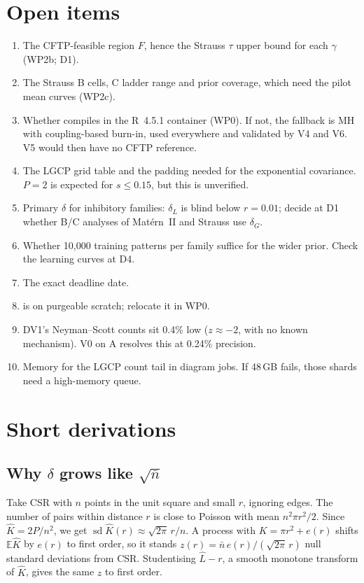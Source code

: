 \documentclass[10pt,a4paper]{article}
\newcommand{\code}[1]{\texttt{\detokenize{#1}}}
\newcommand{\nbar}{\bar n}
\newcommand{\E}{\mathbb{E}}
\begin{document}
\section{Open items}\label{sec:open}
\begin{enumerate}
  \item The CFTP-feasible region $F$, hence the Strauss $\tau$ upper bound for each $\gamma$ (WP2b; D1).
  \item The Strauss B cells, C ladder range and prior coverage, which need the pilot mean curves (WP2c).
  \item Whether \code{spatstat.random} compiles in the R~4.5.1 container (WP0). If not, the fallback is MH with coupling-based burn-in, used everywhere and validated by V4 and V6. V5 would then have no CFTP reference.
  \item The LGCP grid table and the padding needed for the exponential covariance. $P=2$ is expected for $s\le0.15$, but this is unverified.
  \item Primary $\delta$ for inhibitory families: $\delta_L$ is blind below $r=0.01$; decide at D1 whether B/C analyses of Mat\'ern~II and Strauss use $\delta_G$.
  \item Whether 10{,}000 training patterns per family suffice for the wider prior. Check the learning curves at D4.
  \item The exact deadline date.
  \item \code{cloud-env} is on purgeable scratch; relocate it in WP0.
  \item DV1's Neyman--Scott counts sit 0.4\% low ($z\approx-2$, with no known mechanism). V0 on A resolves this at 0.24\% precision.
  \item Memory for the LGCP count tail in diagram jobs. If 48\,GB fails, those shards need a high-memory queue.
\end{enumerate}

\appendix
\section{Short derivations}\label{app:deriv}

\subsection{Why $\delta$ grows like $\sqrt{\nbar}$}\label{app:counting}
Take CSR with $n$ points in the unit square and small $r$, ignoring edges. The number of pairs within distance $r$ is close to Poisson with mean $n^2\pi r^2/2$. Since $\hat K=2P/n^2$, we get $\operatorname{sd}\hat K(r)\approx\sqrt{2\pi}\,r/n$. A process with $K=\pi r^2+e(r)$ shifts $\E\hat K$ by $e(r)$ to first order, so it stands $z(r)=\nbar\,e(r)/(\sqrt{2\pi}\,r)$ null standard deviations from CSR. Studentising $\hat L-r$, a smooth monotone transform of $\hat K$, gives the same $z$ to first order.
\end{document}
